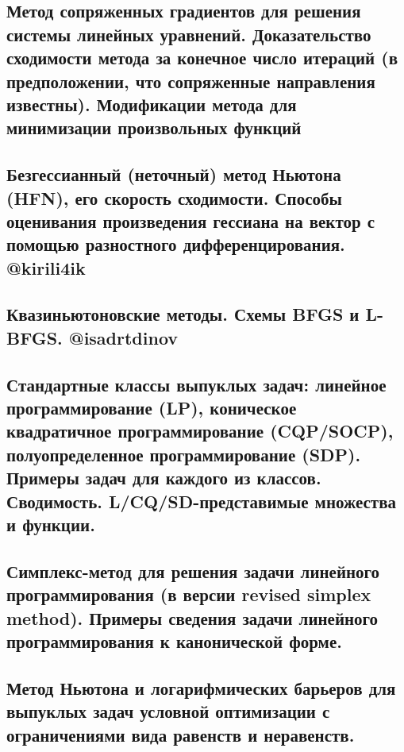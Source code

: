 \documentclass[a4paper, 16pt]{article}
\begin{document}
    
    
    \subsection{Метод сопряженных градиентов для решения системы линейных уравнений. Доказательство сходимости метода за конечное число итераций (в предположении, что сопряженные направления известны). Модификации метода для минимизации произвольных функций}
    
    

    \subsection{Безгессианный (неточный) метод Ньютона (HFN), его скорость сходимости. Способы оценивания произведения гессиана на вектор с помощью разностного дифференцирования. @kirili4ik}

    

    \subsection{Квазиньютоновские методы. Схемы BFGS и L-BFGS. @isadrtdinov}

    

    \subsection{Стандартные классы выпуклых задач: линейное программирование (LP), коническое квадратичное программирование (CQP/SOCP), полуопределенное программирование (SDP). Примеры задач для каждого из классов. Сводимость. L/CQ/SD-представимые множества и функции.}
    
    
    
    \subsection{Симплекс-метод для решения задачи линейного программирования (в версии revised simplex method). Примеры сведения задачи линейного программирования к канонической форме.}

    

    \subsection{Метод Ньютона и логарифмических барьеров для выпуклых задач условной оптимизации с ограничениями вида равенств и неравенств.}
\end{document}
